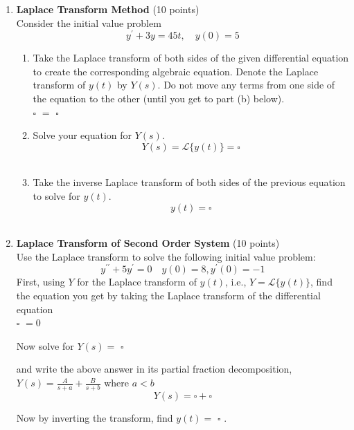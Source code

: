 \begin{enumerate}
  \item \textbf{Laplace Transform Method} (10 points)\\
  Consider the initial value problem
  $$
  y^{\prime}+3 y=45 t, \quad y(0)=5
  $$
  \begin{enumerate}[label=(\alph*)]
    \item Take the Laplace transform of both sides of the given differential equation to create the corresponding algebraic equation. Denote the Laplace transform of $y(t)$ by $Y(s)$. Do not move any terms from one side of the equation to the other (until you get to part (b) below).\\
    $\square$ $=$ $\square$\\
    \begin{subanswer}
    \end{subanswer}
    \item Solve your equation for $Y(s)$.\\
    $$
    Y(s)=\mathcal{L}\{y(t)\}=\square
    $$\\
    \begin{subanswer}
    \end{subanswer}
    \item Take the inverse Laplace transform of both sides of the previous equation to solve for $y(t)$.\\
    $$
    y(t)=\square
    $$\\
    \begin{subanswer}
    \end{subanswer}
  \end{enumerate}

  \item \textbf{Laplace Transform of Second Order System} (10 points)\\
  Use the Laplace transform to solve the following initial value problem:
  $$
  y^{\prime \prime}+5 y^{\prime}=0 \quad y(0)=8, y^{\prime}(0)=-1
  $$
  First, using $Y$ for the Laplace transform of $y(t)$, i.e., $Y=\mathcal{L}\{y(t)\}$, find the equation you get by taking the Laplace transform of the differential equation\\
  $\square$ $=0$\\
  \begin{subanswer}
  \end{subanswer}
  Now solve for $Y(s)=$ $\square$\\
  \begin{subanswer}
  \end{subanswer}
  and write the above answer in its partial fraction decomposition, $Y(s)=\frac{A}{s+a}+\frac{B}{s+b}$ where $a<b$\\
  $$
  Y(s)=\square+\square
  $$
  \begin{subanswer}
  \end{subanswer}
  Now by inverting the transform, find $y(t)=$ $\square$ .\\
  \begin{subanswer}
  \end{subanswer}


\end{enumerate}
